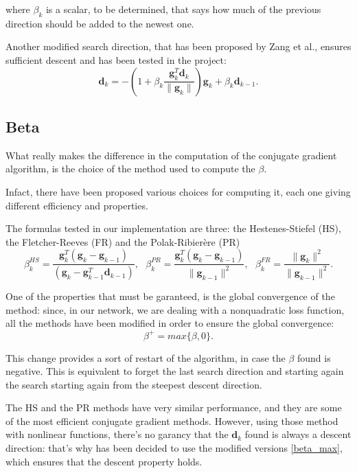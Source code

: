 			where $\beta_k$ is a scalar, to be determined, that says how much of the previous direction should be added to the newest one. 

			Another modified search direction, that has been proposed by Zang et al., ensures sufficient descent and has been tested in the project:
			\begin{equation}
			 \textbf{d}_{k} = -(1 + \beta_k\frac{\textbf{g}_k^T\textbf{d}_{k}}{\|\textbf{g}_k\|})\textbf{g}_k + \beta_k\textbf{d}_{k-1}.
			\end{equation}

		\subsection{Beta}
		\label{sub:beta}
			What really makes the difference in the computation of the conjugate gradient algorithm, is the choice of the method used to compute the $\beta$.

			Infact, there have been proposed various choices for computing it, each one giving different efficiency and properties.

			The formulas tested in our implementation are three: the Hestenes-Stiefel (HS), the Fletcher-Reeves (FR) and the Polak-Ribierère (PR)
			\begin{equation}
			\label{betas}
				 \beta^{HS}_k = \frac{\textbf{g}_k^T(\textbf{g}_k-\textbf{g}_{k-1})}{(\textbf{g}_k-\textbf{g}_{k-1}^T\textbf{d}_{k-1})}, \text{ }
				 \beta^{PR}_k = \frac{\textbf{g}_k^T(\textbf{g}_k-\textbf{g}_{k-1})}{\|\textbf{g}_{k-1}\|^2}, \text{ }
 				 \beta^{FR}_k = \frac{\|\textbf{g}_{k}\|^2}{\|\textbf{g}_{k-1}\|^2}.
			\end{equation}

			One of the properties that must be garanteed, is the global convergence of the method: since, in our network, we are dealing with a nonquadratic loss function, all the methods have been modified in order to ensure the global convergence:
			\begin{equation}
			\label{beta_max}
				 \beta^+ = max\{\beta, 0\}.
			\end{equation}

			This change provides a sort of restart of the algorithm, in case the $\beta$ found is negative. This is equivalent to forget the last search direction and starting again the search starting again from the steepest descent direction.

			The HS and the PR methods have very similar performance, and they are some of the most efficient conjugate gradient methods. 
			However, using those method with nonlinear functions, there's no garancy that the $\textbf{d}_k$ found is always a descent direction: that's why has been decided to use the modified versions \ref{beta_max}, which ensures that the descent property holds.

